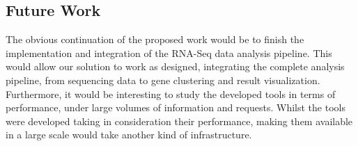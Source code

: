 \documentclass[9pt,a4paper]{extarticle}
\begin{document}
\begin{multicols}{2}
\section{Future Work}

The obvious continuation of the proposed work would be to finish the
implementation and integration of the RNA-Seq data analysis pipeline. This would
allow our solution to work as designed, integrating the complete analysis
pipeline, from sequencing data to gene clustering and result visualization.
Furthermore, it would be interesting to study the developed tools in terms of
performance, under large volumes of information and requests. Whilst the tools
were developed taking in consideration their performance, making them available
in a large scale would take another kind of infrastructure.



\end{multicols}
\end{document}
